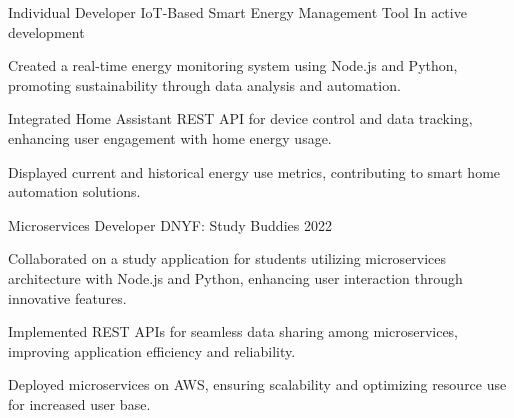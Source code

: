 \begin{cventries}
          \cventry
            {Individual Developer} %
            {IoT-Based Smart Energy Management Tool} %
            {} %
            {In active development} %
            {
              \begin{cvitems} %
              \item {Created a real-time energy monitoring system using Node.js and Python, promoting sustainability through data analysis and automation.}
    \item {Integrated Home Assistant REST API for device control and data tracking, enhancing user engagement with home energy usage.}
    \item {Displayed current and historical energy use metrics, contributing to smart home automation solutions.}
              \end{cvitems}
            }

          \cventry
            {Microservices Developer} %
            {DNYF: Study Buddies} %
            {} %
            {2022} %
            {
              \begin{cvitems} %
              \item {Collaborated on a study application for students utilizing microservices architecture with Node.js and Python, enhancing user interaction through innovative features.}
    \item {Implemented REST APIs for seamless data sharing among microservices, improving application efficiency and reliability.}
    \item {Deployed microservices on AWS, ensuring scalability and optimizing resource use for increased user base.}
              \end{cvitems}
            }
\end{cventries}
